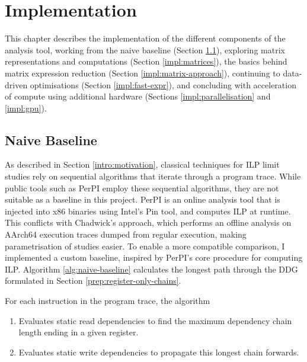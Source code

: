 \chapter{Implementation}

This chapter describes the implementation of the different components of the analysis tool, working from the naive 
baseline
(Section \ref{impl:naive-baseline}),
exploring matrix representations and computations
(Section \ref{impl:matrices}),
the basics behind matrix expression reduction
(Section \ref{impl:matrix-approach}),
continuing to data-driven optimisations
(Section \ref{impl:fast-expr}),
and concluding with acceleration of compute using additional hardware
(Sections \ref{impl:parallelisation} and \ref{impl:gpu}).

\section{Naive Baseline} \label{impl:naive-baseline}

As described in Section \ref{intro:motivation}, classical techniques for 
ILP limit studies rely on sequential algorithms that iterate through a program trace.
While public tools such as PerPI \cite{perpi} employ these sequential algorithms, they are not suitable as a
baseline in this project. PerPI is an online analysis tool that is injected into x86 binaries using Intel's Pin tool,
and computes ILP at runtime.
This conflicts with Chadwick's approach, which performs an offline analysis on AArch64 execution traces dumped from regular execution, 
making parametrisation of studies easier.
To enable a more compatible comparison, I implemented a custom baseline, inspired by PerPI's core procedure for computing ILP.
Algorithm \ref{alg:naive-baseline} calculates the longest path through the DDG formulated in Section \ref{prep:register-only-chains}.

For each instruction in the program trace, the algorithm
\begin{enumerate}
  \item  Evaluates static read dependencies to find the maximum dependency chain length ending in a given register.
  \item  Evaluates static write dependencies to propagate this longest chain forwards.
\end{enumerate}

